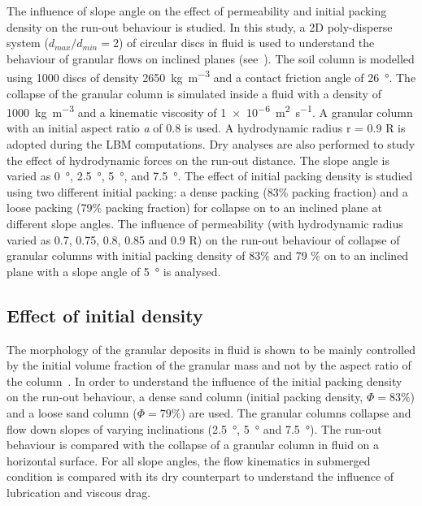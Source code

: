 The influence of slope angle on the effect of permeability and initial packing 
density on the run-out behaviour is studied. In this study, a 2D poly-disperse 
system ($d_{max}/d_{min} = 2$) of circular discs in fluid is used to understand 
the behaviour of granular flows on inclined planes (see~). The 
soil column is modelled using 1000 discs of density 
\SI{2650}{\kg\per\cubic\meter} and a contact friction angle of 
\SI{26}{\degree}. The collapse of the granular column is simulated inside a 
fluid with a density of \SI{1000}{\kg\per\cubic\meter} and a kinematic 
viscosity of \SI{1e-6}{\square\meter\per\second}. A granular column with an 
initial aspect ratio \textit{a} of 0.8 is used. A hydrodynamic radius r = 0.9 R 
is adopted during the LBM computations. Dry analyses are also performed to 
study the effect of hydrodynamic forces on the run-out distance. The slope 
angle is varied as \SI{0}{\degree}, \SI{2.5}{\degree}, \SI{5}{\degree}, and 
\SI{7.5}{\degree}. The effect of initial packing density is studied using two 
different initial packing: a dense packing (83\% packing fraction) and a loose 
packing (79\% packing fraction) for collapse on to an inclined plane at 
different slope angles. The influence of permeability (with hydrodynamic radius 
varied as 0.7, 0.75, 0.8, 0.85 and 0.9 R) on the run-out behaviour of collapse 
of granular columns with initial packing density of 83\% and 79 \% on to an 
inclined plane with a slope angle of 5~\si{\degree} is analysed.


\subsection{Effect of initial density}
The morphology of the granular deposits in fluid is shown to be mainly 
controlled by the initial volume fraction of the granular mass and not by the 
aspect ratio of the column~\citep{Rondon2011,Pailha2008}. In order to 
understand the influence of the initial packing density on the run-out 
behaviour, a dense sand column (initial packing density, $\Phi=83\%$) and a 
loose sand column ($\Phi=79\%$) are used. The granular columns collapse and 
flow down slopes of varying inclinations (\SI{2.5}{\degree}, \SI{5}{\degree} 
and \SI{7.5}{\degree}). The run-out behaviour is compared with the collapse of 
a granular column in fluid on a horizontal surface. For all slope angles, the 
flow kinematics in submerged condition is compared with its dry counterpart to 
understand the influence of lubrication and viscous drag.


